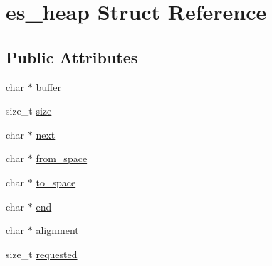 \hypertarget{structes__heap}{\section{es\-\_\-heap Struct Reference}
\label{structes__heap}
}
\subsection*{Public Attributes}
\begin{DoxyCompactItemize}
\item 
char $\ast$ \hyperlink{structes__heap_afec48a227febf62eb6020b0f763cd4ad}{buffer}
\item 
size\-\_\-t \hyperlink{structes__heap_a4483c0fcc97496abd40b2dfa8bcd5d8c}{size}
\item 
char $\ast$ \hyperlink{structes__heap_a0764a90d3c698f3bd3f50ec64ae15808}{next}
\item 
char $\ast$ \hyperlink{structes__heap_adb394bd40473dacd3a85497a76939c7d}{from\-\_\-space}
\item 
char $\ast$ \hyperlink{structes__heap_ae0591495c28dd8f63b335a0477dc46ad}{to\-\_\-space}
\item 
char $\ast$ \hyperlink{structes__heap_af8b4dd2b90b26223ec8fe81943a380d8}{end}
\item 
char $\ast$ \hyperlink{structes__heap_a29cd92b0a308c43c32ffa63804d6c18f}{alignment}
\item 
size\-\_\-t \hyperlink{structes__heap_aeeee0615c3497b7585bd81c0e6aee20d}{requested}
\end{DoxyCompactItemize}


